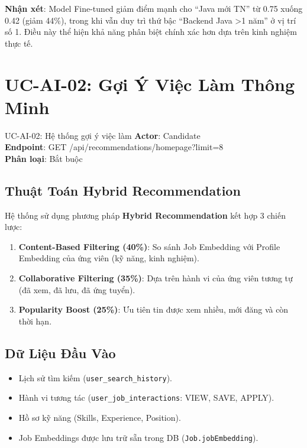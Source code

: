 \documentclass[12pt, a4paper]{report}
\begin{document}
\textbf{Nhận xét}: Model Fine-tuned giảm điểm mạnh cho ``Java mới TN'' từ 0.75 xuống 0.42 (giảm 44\%), trong khi vẫn duy trì thứ bậc ``Backend Java >1 năm'' ở vị trí số 1. Điều này thể hiện khả năng phân biệt chính xác hơn dựa trên kinh nghiệm thực tế.

\section{UC-AI-02: Gợi Ý Việc Làm Thông Minh}

\begin{requirementbox}{UC-AI-02: Hệ thống gợi ý việc làm}
\textbf{Actor}: Candidate \\
\textbf{Endpoint}: GET /api/recommendations/homepage?limit=8 \\
\textbf{Phân loại}: Bắt buộc
\end{requirementbox}

\subsection{Thuật Toán Hybrid Recommendation}

Hệ thống sử dụng phương pháp \textbf{Hybrid Recommendation} kết hợp 3 chiến lược:

\begin{enumerate}
    \item \textbf{Content-Based Filtering (40\%)}: So sánh Job Embedding với Profile Embedding của ứng viên (kỹ năng, kinh nghiệm).
    \item \textbf{Collaborative Filtering (35\%)}: Dựa trên hành vi của ứng viên tương tự (đã xem, đã lưu, đã ứng tuyển).
    \item \textbf{Popularity Boost (25\%)}: Ưu tiên tin được xem nhiều, mới đăng và còn thời hạn.
\end{enumerate}

\subsection{Dữ Liệu Đầu Vào}

\begin{itemize}
    \item Lịch sử tìm kiếm (\texttt{user\_search\_history}).
    \item Hành vi tương tác (\texttt{user\_job\_interactions}: VIEW, SAVE, APPLY).
    \item Hồ sơ kỹ năng (Skills, Experience, Position).
    \item Job Embeddings được lưu trữ sẵn trong DB (\texttt{Job.jobEmbedding}).
\end{itemize}
\end{document}
